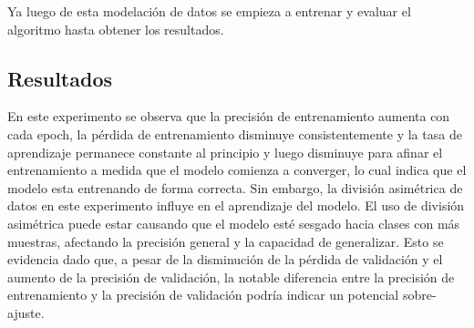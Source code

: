 Ya luego de esta modelación de datos se empieza a entrenar y evaluar el algoritmo hasta obtener los resultados.

\subsection*{Resultados}

En este experimento se observa que la precisión de entrenamiento aumenta con cada epoch, la pérdida de entrenamiento disminuye consistentemente y la tasa de aprendizaje permanece constante al principio y luego disminuye para afinar el entrenamiento a medida que el modelo comienza a converger, lo cual indica que el modelo esta entrenando de forma correcta. Sin embargo, la división asimétrica de datos en este experimento influye en el aprendizaje del modelo. El uso de división asimétrica puede estar causando que el modelo esté sesgado hacia clases con más muestras, afectando la precisión general y la capacidad de generalizar. Esto se evidencia dado que, a pesar de la disminución de la pérdida de validación y el aumento de la precisión de validación, la notable diferencia entre la precisión de entrenamiento y la precisión de validación podría indicar un potencial sobre-ajuste.

